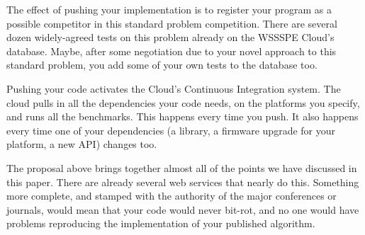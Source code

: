 \documentclass[conference]{IEEEtran}
\begin{document}
The effect of pushing your implementation is to register your program
as a possible competitor in this standard problem competition. There
are several dozen widely-agreed tests on this problem already on the
WSSSPE Cloud's database. Maybe, after some negotiation due to your
novel approach to this standard problem, you add some of your
own tests to the database too.

Pushing your code activates the Cloud's Continuous Integration
system.  The cloud pulls in all the dependencies your code needs, on
the platforms you specify, and runs all the benchmarks. This happens
every time you push. It also happens every time one of your
dependencies (a library, a firmware upgrade for your platform, a new
API) changes too.

The proposal above brings together almost all of the points we have
discussed in this paper. There are already several web services that
nearly do this. Something more complete, and stamped with the
authority of the major conferences or journals, would mean that your
code would never bit-rot, and no one would have problems reproducing
the implementation of your published algorithm.






\end{document}
